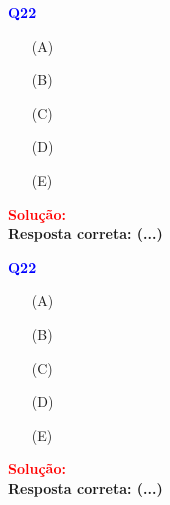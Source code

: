 \documentclass[a4paper,12pt]{article}
\newcommand{\printingbibliography}{%

    \pagestyle{myheadings}
    \markright{}
    \sloppy
    \printbibliography[heading=bibintoc, %
                   title=Refer\^encias %
                  ]
    \fussy%
}
\begin{document}
\begin{flushleft}
\textbf{\textcolor{blue}{\Large Q22}}\\


\begin{itemize}
\item[(A)] 
\item[(B)]   
\item[(C)] 
\item[(D)] 
\item[(E)] 
\end{itemize}

\vspace{0.5cm}

\textcolor{red}{\textbf{Solução:}}\\

\textbf{Resposta correta: \colorbox{green!50}{(...)}}

\end{flushleft}

\begin{flushleft}
\textbf{\textcolor{blue}{\Large Q22}}\\


\begin{itemize}
\item[(A)] 
\item[(B)]   
\item[(C)] 
\item[(D)] 
\item[(E)] 
\end{itemize}

\vspace{0.5cm}

\textcolor{red}{\textbf{Solução:}}\\

\textbf{Resposta correta: \colorbox{green!50}{(...)}}

\end{flushleft}

\end{document}
